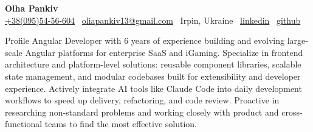 \documentclass{resume}
\begin{document}
\begin{center}
    \vspace{-10mm}
    {\Huge \bf {Olha Pankiv}} \\
    \vspace{1mm}
    \href{tel:+380955456604}{+38(095)54-56-604} \textbullet\
    \href{mailto:oliapankiv13@gmail.com}{oliapankiv13@gmail.com} \textbullet\
    {Irpin, Ukraine} \textbullet\
    \href{https://linkedin.com/in/olia-pankiv/}{linkedin} \textbullet\
    \href{https://github.com/oliapankiv}{github}
\end{center}

\vspace{-3mm}
\begin{rSection}{Profile}
    {Angular Developer with 6 years of experience building and evolving large-scale Angular platforms for enterprise SaaS and iGaming. Specialize in frontend architecture and platform-level solutions: reusable component libraries, scalable state management, and modular codebases built for extensibility and developer experience. Actively integrate AI tools like Claude Code into daily development workflows to speed up delivery, refactoring, and code review. Proactive in researching non-standard problems and working closely with product and cross-functional teams to find the most effective solution.}
\end{rSection}
\end{document}
